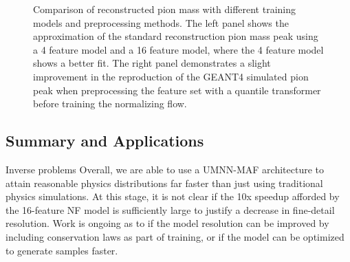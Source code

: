         \begin{figure}[H]
            \centering
            \caption[Reconstructed Pion Mass Distributions]{Comparison of reconstructed pion mass with different training models and preprocessing methods. The left panel shows the approximation of the standard reconstruction pion mass peak using a 4 feature model and a 16 feature model, where the 4 feature model shows a better fit. The right panel demonstrates a slight improvement in the reproduction of the GEANT4 simulated pion peak when preprocessing the feature set with a quantile transformer before training the normalizing flow.}
            \label{fig:combined_pion_comparison}
        \end{figure}



\subsection{Summary and Applications}


Inverse problems
 Overall, we are able to use a UMNN-MAF architecture to attain reasonable physics distributions far faster than just using traditional physics simulations. At this stage, it is not clear if the 10x speedup afforded by the 16-feature NF model is sufficiently large to justify a decrease in fine-detail resolution. Work is ongoing as to if the model resolution can be improved by including conservation laws as part of training, or if the model can be optimized to generate samples faster. 
        
